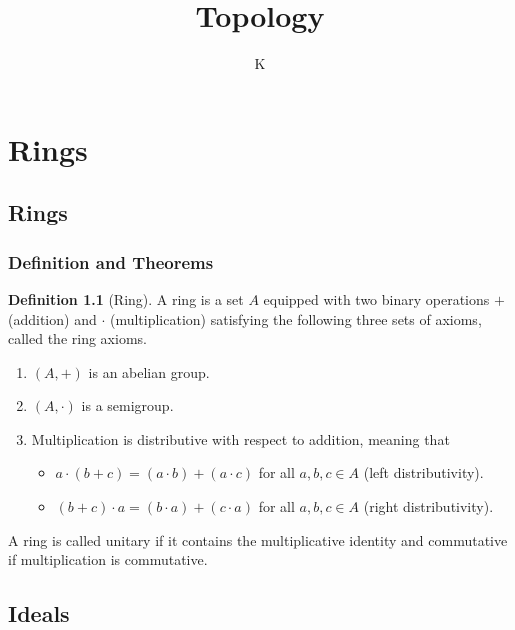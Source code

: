 \documentclass[a4paper]{book}
\title{Topology}
\author{K}
\theoremstyle{definition}
\newtheorem{definition}{Definition}[]
\begin{document}
\maketitle
\tableofcontents
\part{Rings}
\chapter{Rings}
\section{Definition and Theorems}
\begin{defbox}
    \begin{definition}[Ring]
        A ring is a set \(A\) equipped with two binary operations \(+\) (addition) and \(\cdot\) (multiplication) satisfying the following three sets of axioms, called the ring axioms.
    \begin{enumerate}
      \item \((A, +)\) is an abelian group.
      \item \((A, \cdot)\) is a semigroup.
      \item Multiplication is distributive with respect to addition, meaning that
      \begin{itemize}
        \item \(a \cdot (b + c) = (a \cdot b) + (a \cdot c)\) for all \(a, b, c \in A\) (left distributivity).
        \item \((b + c) \cdot a = (b \cdot a) + (c \cdot a)\) for all \(a, b, c \in A\) (right distributivity).
      \end{itemize}
    \end{enumerate}
    A ring is called unitary if it contains the multiplicative identity and commutative if multiplication is commutative.
    \end{definition}
\end{defbox}

\chapter{Ideals}
\end{document}
